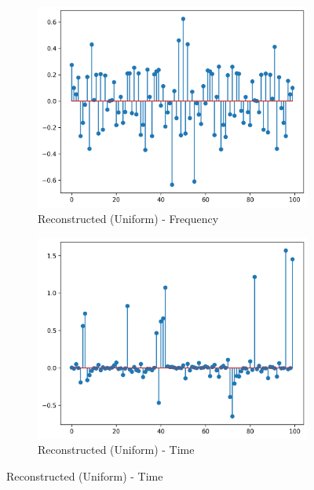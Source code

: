 \documentclass[11pt]{article}
\begin{document}
\begin{figure}[H]
    \begin{subfigure}{.45\textwidth}
        \centering
        \includegraphics[width=\linewidth]{figs/q2b_uniformly_recovered_signal_fft.png}
        \caption{Reconstructed (Uniform) - Frequency}
        \label{fig:uniform_reconstructed_signal_fft}
    \end{subfigure}%
    \begin{subfigure}{.45\textwidth}
        \centering
        \includegraphics[width=\linewidth]{figs/q2b_uniformly_recovered_signal.png}
        \caption{Reconstructed (Uniform) - Time}
        \label{fig:uniform_reconstructed_signal}
    \end{subfigure}
    

\end{figure}
\end{document}
